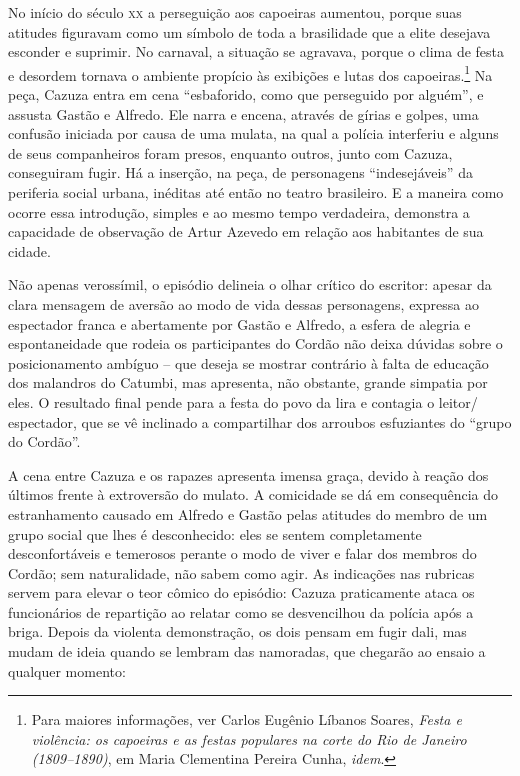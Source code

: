 No início do século \textsc{xx} a perseguição aos capoeiras\label{capoeira} aumentou, porque suas
atitudes figuravam como um símbolo de toda a brasilidade que a elite
desejava esconder e suprimir. No carnaval, a situação se agravava,
porque o clima de festa e desordem tornava o ambiente propício às
exibições e lutas dos capoeiras.\footnote{ Para maiores informações, ver Carlos Eugênio Líbanos Soares, \textit{Festa e
violência: os capoeiras e as festas populares na corte do Rio de
Janeiro (1809–1890)}, em Maria Clementina Pereira Cunha,
\textit{idem}.} Na peça, Cazuza entra em cena
“esbaforido, como que perseguido por alguém”, e assusta Gastão e
Alfredo. Ele narra e encena, através de gírias e golpes, uma confusão
iniciada por causa de uma mulata, na qual a polícia interferiu e alguns
de seus companheiros foram presos, enquanto outros, junto com Cazuza,
conseguiram fugir. Há a inserção, na peça, de personagens
“indesejáveis” da periferia social urbana, inéditas até então no teatro
brasileiro. E a maneira como ocorre essa introdução, simples e ao mesmo
tempo verdadeira, demonstra a capacidade de observação de Artur Azevedo
em relação aos habitantes de sua cidade.

Não apenas verossímil, o episódio delineia o olhar crítico do escritor:
apesar da clara mensagem de aversão ao modo de vida dessas personagens,
expressa ao espectador franca e abertamente por Gastão e Alfredo, a
esfera de alegria e espontaneidade que rodeia os participantes do
Cordão não deixa dúvidas sobre o posicionamento ambíguo -- que deseja se
mostrar contrário à falta de educação dos malandros do Catumbi, mas
apresenta, não obstante, grande simpatia por eles. O resultado final
pende para a festa do povo da lira e contagia o leitor/\,espectador, que
se vê inclinado a compartilhar dos arroubos esfuziantes do “grupo do
Cordão”.

A cena entre Cazuza e os rapazes apresenta imensa graça, devido à reação
dos últimos frente à extroversão do mulato. A comicidade se dá em
consequência do estranhamento causado em Alfredo e Gastão pelas
atitudes do membro de um grupo social que lhes é desconhecido: eles se
sentem completamente desconfortáveis e temerosos perante o modo de
viver e falar dos membros do Cordão; sem naturalidade, não sabem como
agir. As indicações nas rubricas servem para elevar o teor cômico do
episódio: Cazuza praticamente ataca os funcionários de repartição ao
relatar como se desvencilhou da polícia após a briga. Depois da
violenta demonstração, os dois pensam em fugir dali, mas mudam de ideia
quando se lembram das namoradas, que chegarão ao ensaio a qualquer
momento:
\medskip

